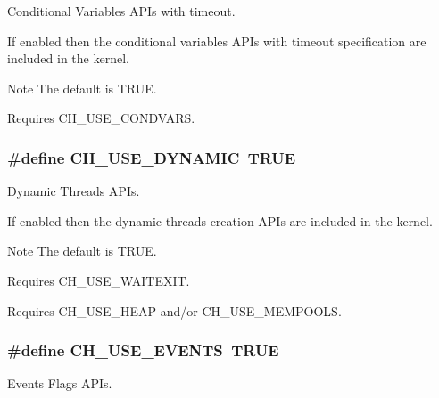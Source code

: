Conditional Variables A\+P\+Is with timeout. 

If enabled then the conditional variables A\+P\+Is with timeout specification are included in the kernel.

\begin{DoxyNote}{Note}
The default is {\ttfamily T\+R\+U\+E}. 

Requires {\ttfamily C\+H\+\_\+\+U\+S\+E\+\_\+\+C\+O\+N\+D\+V\+A\+R\+S}. 
\end{DoxyNote}
\hypertarget{group__config_gaae4996e24bbee7d66528671cec8b8749}{}
\subsubsection[{C\+H\+\_\+\+U\+S\+E\+\_\+\+D\+Y\+N\+A\+M\+I\+C}]{\setlength{\rightskip}{0pt plus 5cm}\#define C\+H\+\_\+\+U\+S\+E\+\_\+\+D\+Y\+N\+A\+M\+I\+C~T\+R\+U\+E}\label{group__config_gaae4996e24bbee7d66528671cec8b8749}


Dynamic Threads A\+P\+Is. 

If enabled then the dynamic threads creation A\+P\+Is are included in the kernel.

\begin{DoxyNote}{Note}
The default is {\ttfamily T\+R\+U\+E}. 

Requires {\ttfamily C\+H\+\_\+\+U\+S\+E\+\_\+\+W\+A\+I\+T\+E\+X\+I\+T}. 

Requires {\ttfamily C\+H\+\_\+\+U\+S\+E\+\_\+\+H\+E\+A\+P} and/or {\ttfamily C\+H\+\_\+\+U\+S\+E\+\_\+\+M\+E\+M\+P\+O\+O\+L\+S}. 
\end{DoxyNote}
\hypertarget{group__config_ga5e3ac686cd33ad40a89aaaf97b3dc781}{}
\subsubsection[{C\+H\+\_\+\+U\+S\+E\+\_\+\+E\+V\+E\+N\+T\+S}]{\setlength{\rightskip}{0pt plus 5cm}\#define C\+H\+\_\+\+U\+S\+E\+\_\+\+E\+V\+E\+N\+T\+S~T\+R\+U\+E}\label{group__config_ga5e3ac686cd33ad40a89aaaf97b3dc781}


Events Flags A\+P\+Is. 


